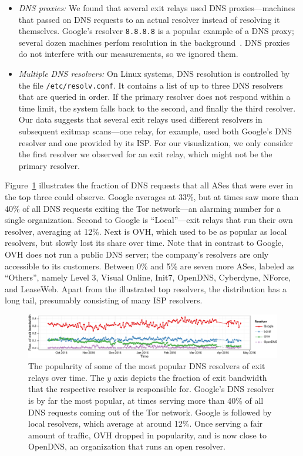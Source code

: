 \begin{itemize}
\item {\em DNS proxies:}
We found that several exit relays used DNS
proxies---machines that passed on DNS requests to an actual resolver
instead of resolving it themselves.  Google's resolver {\tt 8.8.8.8} is a popular
example of a DNS proxy;
several dozen machines perfom resolution in the
background~\cite{google-proxies}.  DNS proxies do
not interfere with our measurements, so we ignored them.

\item {\em Multiple DNS resolvers:}
On Linux systems, DNS resolution is controlled by the file
\texttt{/etc/resolv.conf}.  It contains a list of up to three DNS resolvers
that are queried in order.  If the primary resolver does not respond within a
time limit, the system falls back to the second, and finally the third
resolver.  Our data suggests that several exit relays used
different resolvers in subsequent exitmap scans---one relay, for example, used
both Google's DNS resolver and one provided by its ISP.  For our visualization,
we only consider the first resolver we observed for an exit relay, which might
not be the primary resolver.
\end{itemize}
\noindent
Figure~\ref{fig:exit-resolvers} illustrates the fraction of DNS requests that
all ASes that were ever in the top three could observe.  Google averages at
33\%, but at times saw more than 40\% of all DNS requests exiting the Tor
network---an alarming number for a single organization.  Second to Google is
``Local''---exit relays that run their own resolver, averaging at 12\%.
Next is OVH, which used to be as popular as local resolvers, but slowly lost its
share over time.  Note that in contrast to Google, OVH does not run a public
DNS server; the company's resolvers are only accessible to its customers.
Between 0\% and 5\% are seven more ASes, labeled as ``Others'', namely Level 3,
Visual Online, Init7, OpenDNS, Cyberdyne, NForce, and LeaseWeb.  Apart from the
illustrated top resolvers, the distribution has a long tail, presumably
consisting of many ISP resolvers.

\begin{figure}[t]
	\centering
	\includegraphics[width=\linewidth]{figures/exit-resolvers.pdf}
	\caption{The popularity of some of the most popular DNS resolvers of exit
		relays over time.  The $y$ axis depicts the fraction of exit bandwidth
		that the respective resolver is responsible for.  Google's DNS resolver
		is by far the most popular, at times serving more than 40\% of all DNS
		requests coming out of the Tor network.  Google is followed by local
		resolvers, which average at around 12\%.  Once serving a fair amount of
		traffic, OVH dropped in popularity, and is now close to OpenDNS, an
		organization that runs an open resolver.}
	\label{fig:exit-resolvers}
\end{figure}


